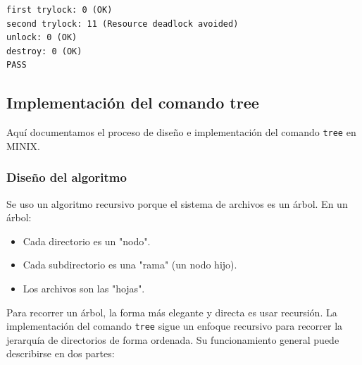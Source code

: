 \documentclass[12pt,spanish]{article}
\begin{document}
\vspace{-1cm}
\begin{verbatim}
first trylock: 0 (OK)
second trylock: 11 (Resource deadlock avoided)
unlock: 0 (OK)
destroy: 0 (OK)
PASS
\end{verbatim}

\subsection{Implementación del comando tree}
Aquí documentamos el proceso de diseño e implementación del comando \texttt{tree} en MINIX.
\subsubsection*{Diseño del algoritmo}
Se uso un algoritmo recursivo porque el sistema de archivos es un árbol. En un árbol:
\begin{itemize}
    \item Cada directorio es un "nodo".
    \item Cada subdirectorio es una "rama" (un nodo hijo).
    \item Los archivos son las "hojas".
\end{itemize}
Para recorrer un árbol, la forma más elegante y directa es usar recursión.
La implementación del comando \texttt{tree} sigue un enfoque recursivo para recorrer la jerarquía de directorios de forma ordenada. Su funcionamiento general puede describirse en dos partes:
\end{document}
